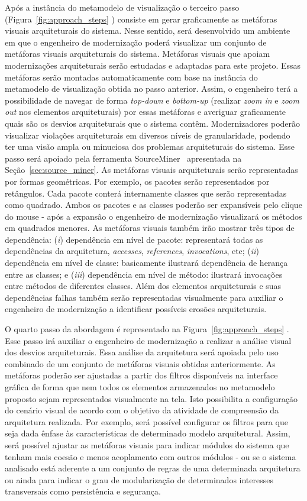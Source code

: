 \documentclass[12pt]{article}
\begin{document}
Após a instância do metamodelo de visualização o terceiro passo (Figura~\ref{fig:approach_steps} ) consiste em gerar graficamente as metáforas visuais arquiteturais do sistema. Nesse sentido, será desenvolvido um ambiente em que o engenheiro de modernização poderá visualizar um conjunto de metáforas visuais arquiteturais do sistema. Metáforas visuais que apoiam modernizações arquiteturais serão estudadas e adaptadas para este projeto. Essas metáforas serão montadas automaticamente com base na instância do metamodelo de visualização obtida no passo anterior. Assim, o engenheiro terá a possibilidade de navegar de forma \textit{top-down} e \textit{bottom-up} (realizar \textit{zoom in} e \textit{zoom out} nos elementos arquiteturais) por essas metáforas e averiguar graficamente quais são os desvios arquiteturais que o sistema contêm. Modernizadores poderão visualizar violações arquiteturais em diversos níveis de granularidade, podendo ter uma visão ampla ou minuciosa dos problemas arquiteturais do sistema. Esse passo será apoiado pela ferramenta SourceMiner~\cite{source_miner_glauco} apresentada na Seção~\ref{sec:source_miner}. As metáforas visuais arquiteturais serão representadas por formas geométricas. Por exemplo, os pacotes serão representados por retângulos. Cada pacote conterá internamente classes que serão representadas como quadrado. Ambos os pacotes e as classes poderão ser expansíveis pelo clique do mouse - após a expansão o engenheiro de modernização visualizará os métodos em quadrados menores. As metáforas visuais também irão mostrar três tipos de dependência: (\textit{i}) dependência em nível de pacote: representará todas as dependências da arquitetura, \textit{accesses}, \textit{references}, \textit{invocations}, etc; (\textit{ii}) dependência em nível de classe: basicamente ilustrará dependência de herança entre as classes; e (\textit{iii}) dependência em nível de método: ilustrará invocações entre métodos de diferentes classes. Além dos elementos arquiteturais e suas dependências falhas também serão representadas visualmente para auxiliar o engenheiro de modernização a identificar possíveis erosões arquiteturais.


O quarto passo da abordagem é representado na Figura~\ref{fig:approach_steps} . Esse passo irá auxiliar o engenheiro de modernização a realizar a análise visual dos desvios arquiteturais. Essa análise da arquitetura será apoiada pelo uso combinado de um conjunto de metáforas visuais obtidas anteriormente. As metáforas poderão ser ajustadas a partir dos filtros disponíveis na interface gráfica de forma que nem todos os elementos armazenados no metamodelo proposto sejam representados visualmente na tela. Isto possibilita a configuração do cenário visual de acordo com o objetivo da atividade de compreensão da arquitetura realizada. Por exemplo, será possível configurar os filtros para que seja dada ênfase às características de determinado modelo arquitetural. Assim, será possível ajustar as metáforas visuais para indicar módulos do sistema que tenham mais coesão e menos acoplamento com outros módulos - ou se o sistema analisado está aderente a um conjunto de regras de uma determinada arquitetura ou ainda para indicar o grau de modularização de determinados interesses transversais como persistência e segurança.
\end{document}
